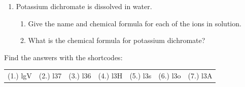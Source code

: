 \begin{enumerate}[noitemsep, label=\textbf{\arabic*}. ]
\begin{figure}[H]
\begin{center}
      \vspace{2pt}
    \vspace{.1in}
    \end{center}
 \end{figure}               \label{m38689*uid185}\item Potassium dichromate is dissolved in water.
\label{m38689*id148361}\begin{enumerate}[noitemsep, label=\textbf{\alph*}. ] 
            \label{m38689*uid186}\item Give the name and chemical formula for each of the ions in solution.
\label{m38689*uid187}\item What is the chemical formula for potassium dichromate?
\end{enumerate}
                \end{enumerate}
  \label{m38689**end}
  \label{6cd7661dc7a31822d94f8eef4ac8e3a5**end}
\par {} Find the answers with the shortcodes:
 \par \begin{tabular}[h]{cccccc}
 (1.) lgV  &  (2.) l37  &  (3.) l36  &  (4.) l3H  &  (5.) l3s  &  (6.) l3o  &  (7.) l3A  & \end{tabular}

